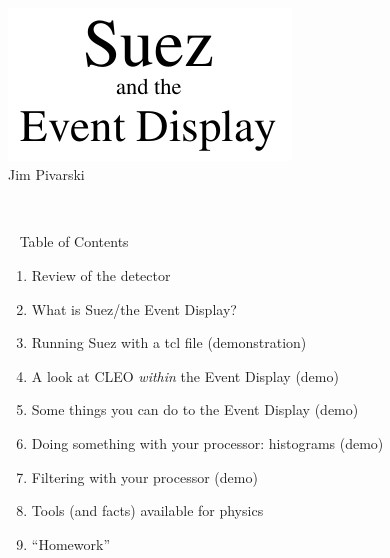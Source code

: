 \documentclass[landscape]{article}
\newenvironment{slide}{\mbox{ }\vfill}{\vfill \mbox{ } \pagebreak}
\begin{document}
\Huge
\renewcommand{\labelitemi}{-}
\renewcommand{\labelenumii}{\alph{enumii}.}
\setlength{\parindent}{0 cm}

\begin{slide}
\begin{center}
\includegraphics[width=0.9\linewidth]{title} \\
Jim Pivarski
\end{center}
\end{slide}

\begin{slide}
  Table of Contents

  \vfill
  \begin{center}
    \begin{minipage}{22 cm}
      \begin{enumerate}\setlength{\itemsep}{0.5 cm}
        
        \item Review of the detector

	\item What is Suez/the Event Display?

        \item Running Suez with a tcl file (demonstration)

        \item A look at CLEO {\it within} the Event Display (demo)

        \item Some things you can do to the Event Display (demo)

        \item Doing something with your processor: histograms (demo)

        \item Filtering with your processor (demo)

        \item Tools (and facts) available for physics

        \item ``Homework''

      \end{enumerate}
    \end{minipage}
  \end{center}

  \vfill
\end{slide}
\end{document}
